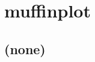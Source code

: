 
\cleardoublepage


\chapter{muffinplot}\label{ch:muffinplot}

\hfill \break

\newpage

\section{(none)}

